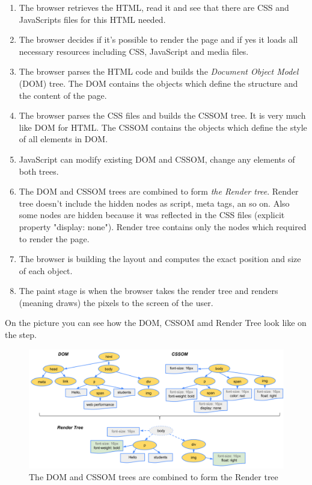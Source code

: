 \begin{enumerate}
    \item The browser retrieves the HTML, read it and see that there are CSS and JavaScripts files for this HTML needed.
    \item The browser decides if it's possible to render the page and if yes it loads all necessary resources including CSS, JavaScript and media files.
    \item The browser parses the HTML code and builds the \textit{Document Object Model} (DOM) tree. The DOM contains the objects which define the structure and the content of the page.
    \item The browser parses the CSS files and builds the CSSOM tree. It is very much like DOM for HTML. The CSSOM contains the objects which define the style of all elements in DOM.
    \item JavaScript can modify existing DOM and CSSOM, change any elements of both trees.
    \item The DOM and CSSOM trees are combined to form \textit{the Render tree}. Render tree doesn't include the hidden nodes as script, meta tags, an so on. Also some nodes are hidden because it was reflected in the CSS files (explicit property "display: none"). Render tree contains only the nodes which required to render the page.
    \item The browser is building the layout and computes the exact position and size of each object.
    \item The paint stage is when the browser takes the render tree and renders (meaning draws) the pixels to the screen of the user. 
\end{enumerate}

On the picture  you can see how the DOM, CSSOM amd Render Tree look like on the  step.\\

\begin{figure}[h]
\begin{center}
\includegraphics[width=1.0\textwidth]{figures02/render-tree-construction}
\caption{The DOM and CSSOM trees are combined to form the Render tree}
\label{fig:domcsstree}
\end{center}
\end{figure}

